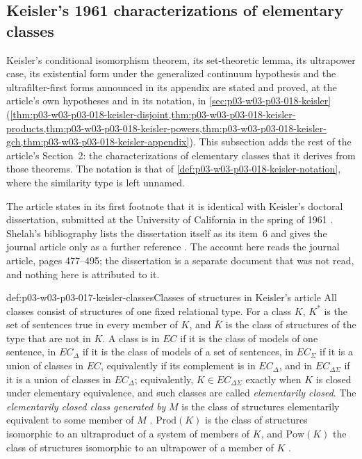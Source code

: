 \subsection{Keisler's 1961 characterizations of elementary classes}
\label{sec:p03-w03-p03-017-keisler1961}

Keisler's conditional isomorphism theorem, its set-theoretic lemma, its
ultrapower case, its existential form under the generalized continuum
hypothesis and the ultrafilter-first forms announced in its appendix are
stated and proved, at the article's own hypotheses and in its notation, in
\cref{sec:p03-w03-p03-018-keisler}
(\cref{thm:p03-w03-p03-018-keisler-disjoint,thm:p03-w03-p03-018-keisler-products,thm:p03-w03-p03-018-keisler-powers,thm:p03-w03-p03-018-keisler-gch,thm:p03-w03-p03-018-keisler-appendix}).
This subsection adds the rest of the article's Section~2: the
characterizations of elementary classes that it derives from those theorems.
The notation is that of \cref{def:p03-w03-p03-018-keisler-notation}, where
the similarity type is left unnamed.

The article states in its first footnote that it is identical with Keisler's
doctoral dissertation, submitted at the University of California in the
spring of 1961 \cite[p.~477, footnote~*]{Keisler1961ElementaryClasses}.
Shelah's bibliography lists the dissertation itself as its item~6 and gives
the journal article only as a further reference
\cite[p.~232, reference~6]{Shelah1971Ultrapowers}.  The account here reads
the journal article, pages 477--495; the dissertation is a separate document
that was not read, and nothing here is attributed to it.

\begin{hbconvention}{def:p03-w03-p03-017-keisler-classes}{Classes of structures in Keisler's article}
All classes consist of structures of one fixed relational type.  For a
class \(K\), \(K^*\) is the set of sentences true in every member of \(K\),
and \(\bar K\) is the class of structures of the type that are not in \(K\).
A class is in \(EC\) if it is the class of models of one sentence, in
\(EC_\Delta\) if it is the class of models of a set of sentences, in
\(EC_\Sigma\) if it is a union of classes in \(EC\), equivalently if its
complement is in \(EC_\Delta\), and in
\(EC_{\Delta\Sigma}\) if it is a union of classes in \(EC_\Delta\);
equivalently, \(K\in EC_{\Delta\Sigma}\) exactly when \(K\) is closed under
elementary equivalence, and such classes are called \emph{elementarily
closed}.  The \emph{elementarily closed class generated by} \(M\) is the
class of structures elementarily equivalent to some member of \(M\)
\cite[pp.~481--482]{Keisler1961ElementaryClasses}.  \(\mathrm{Prod}(K)\) is
the class of structures isomorphic to an ultraproduct of a system of members
of \(K\), and \(\mathrm{Pow}(K)\) the class of structures isomorphic to an
ultrapower of a member of \(K\) \cite[p.~483]{Keisler1961ElementaryClasses}.
\end{hbconvention}

